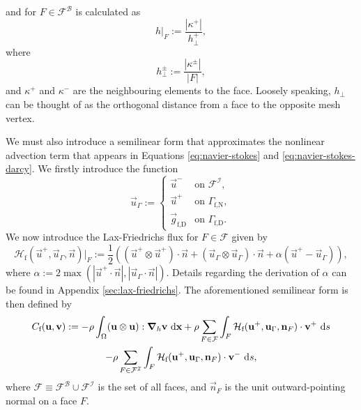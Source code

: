             and for $F \in \mathcal{F}^\mathcal{B}$ is calculated as
            \begin{equation*}
                h|_F := \frac{|\kappa^+|}{h^+_\perp},
            \end{equation*}
            where
            \begin{equation*}
                h^\pm_\perp := \frac{|\kappa^\pm|}{|F|},
            \end{equation*}
            and $\kappa^+$ and $\kappa^-$ are the neighbouring elements to the face. Loosely speaking, $h_\perp$ can be thought of as the orthogonal distance from a face to the opposite mesh vertex.

            We must also introduce a semilinear form that approximates the nonlinear advection term that appears in Equations \eqref{eq:navier-stokes} and \eqref{eq:navier-stokes-darcy}. We firstly introduce the function
            \begin{equation}
                \vec{u}_\Gamma := 
                \begin{cases}
                    \vec{u}^- & \text{on~} \mathcal{F}^\mathcal{I}, \\
                    \vec{u}^+ & \text{on~} \Gamma_\text{f,N}, \\
                    \vec{g}_\text{f,D} & \text{on~} \Gamma_\text{f,D}.
                \end{cases}
                \label{eq:u_gamma}
            \end{equation}
            We now introduce the Lax-Friedrichs flux for $F \in \mathcal{F}$ given by
            \begin{equation}
                \mathcal{H}_\text{f}(\vec{u}^+, \vec{u}_\Gamma, \vec{n})|_F := \frac{1}{2} ((\vec{u}^+ \otimes \vec{u}^+) \cdot \vec{n} + (\vec{u}_\Gamma \otimes \vec{u}_\Gamma) \cdot \vec{n} + \alpha(\vec{u}^+ - \vec{u}_\Gamma)),
                \label{eq:lax-friedrichs}
            \end{equation}
            where $\alpha := 2\max(|\vec{u}^+\cdot\vec{n}|, |\vec{u}_\Gamma\cdot\vec{n}|)$. Details regarding the derivation of $\alpha$ can be found in Appendix \ref{sec:lax-friedrichs}. The aforementioned semilinear form is then defined by
            \begin{multline}
                C_\text{f}(\boldsymbol{\mathbf{u}}, \boldsymbol{\mathbf{v}}) := - \rho \int_{\Omega} (\boldsymbol{\mathbf{u}} \otimes \boldsymbol{\mathbf{u}}) : \boldsymbol{\mathbf{\nabla}}_h \boldsymbol{\mathbf{v}} ~\mathrm{d} \boldsymbol{\mathbf{x}} + \rho \sum_{F \in \mathcal{F}} \int_{F} \mathcal{H}_\text{f}(\boldsymbol{\mathbf{u}}^+, \boldsymbol{\mathbf{u}}_\Gamma, \boldsymbol{\mathbf{n}}_F) \cdot \boldsymbol{\mathbf{v}}^+ ~\mathrm{d} s \\ - \rho \sum_{F \in \mathcal{F}^\mathcal{I}} \int_{F} \mathcal{H}_\text{f}(\boldsymbol{\mathbf{u}}^+, \boldsymbol{\mathbf{u}}_\Gamma, \boldsymbol{\mathbf{n}}_F) \cdot \boldsymbol{\mathbf{v}}^- ~\mathrm{d} s,
                \label{eq:nsb-wf-advection}
            \end{multline}
            where $\mathcal{F} \equiv \mathcal{F}^\mathcal{B} \cup \mathcal{F}^\mathcal{I}$ is the set of all faces, and $\vec{n}_F$ is the unit outward-pointing normal on a face $F$.
    
